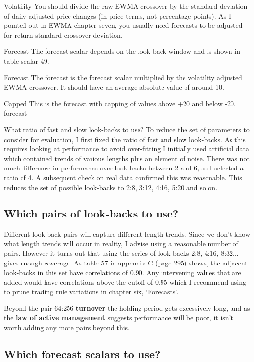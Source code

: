 Volatility You should divide the raw EWMA crossover by the standard deviation of daily adjusted price changes (in price terms, not percentage points). As I pointed out in EWMA chapter seven, you usually need forecasts to be adjusted for return standard crossover deviation.

Forecast The forecast scalar depends on the look-back window and is shown in table scalar 49.

Forecast The forecast is the forecast scalar multiplied by the volatility adjusted EWMA crossover. It should have an average absolute value of around 10.

Capped This is the forecast with capping of values above +20 and below -20. forecast

What ratio of fast and slow look-backs to use? To reduce the set of parameters to consider for evaluation, I first fixed the ratio of fast and slow look-backs. As this requires looking at performance to avoid over-fitting I initially used artificial data which contained trends of various lengths plus an element of noise. There was not much difference in performance over look-backs between 2 and 6, so I selected a ratio of 4. A subsequent check on real data confirmed this was reasonable. This reduces the set of possible look-backs to 2:8, 3:12, 4:16, 5:20 and so on.

\subsection*{Which pairs of look-backs to use?}

Different look-back pairs will capture different length trends. Since we don't know what length trends will occur in reality, I advise using a reasonable number of pairs. However it turns out that using the series of look-backs 2:8, 4:16, 8:32... gives enough coverage. As table 57 in appendix C (page 295) shows, the adjacent look-backs in this set have correlations of 0.90. Any intervening values that are added would have correlations above the cutoff of 0.95 which I recommend using to prune trading rule variations in chapter six, ‘Forecasts'.

Beyond the pair 64:256 \textbf{turnover} the holding period gets excessively long, and as the \textbf{law of active management} suggests performance will be poor, it isn't worth adding any more pairs beyond this.

\subsection*{Which forecast scalars to use?}

